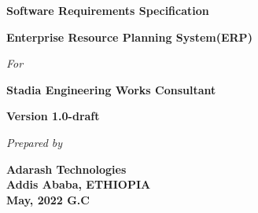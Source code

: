 \begin{titlepage}
\begin{center}
		\begin{LARGE}
			\bf{Software Requirements Specification}
		\end{LARGE}
		\vspace*{30pt}
		
		{\large \textbf{Enterprise Resource Planning System(ERP)}}
		\vspace{1.5\baselineskip}
		
		\textit{For}
		\vspace{1.5\baselineskip}
		
		{\large \textbf{Stadia Engineering Works Consultant}}
		\vspace{1.5\baselineskip}	
		
		{\large \textbf{Version 1.0-draft}}
		\vspace{3.5\baselineskip}
		
		
		\vspace{15\baselineskip}
		
		\textit{Prepared by}
		
		\textbf{Adarash Technologies\\
			Addis Ababa, ETHIOPIA\\
			May, 2022 G.C
		}
	
	\end{center}
\end{titlepage}